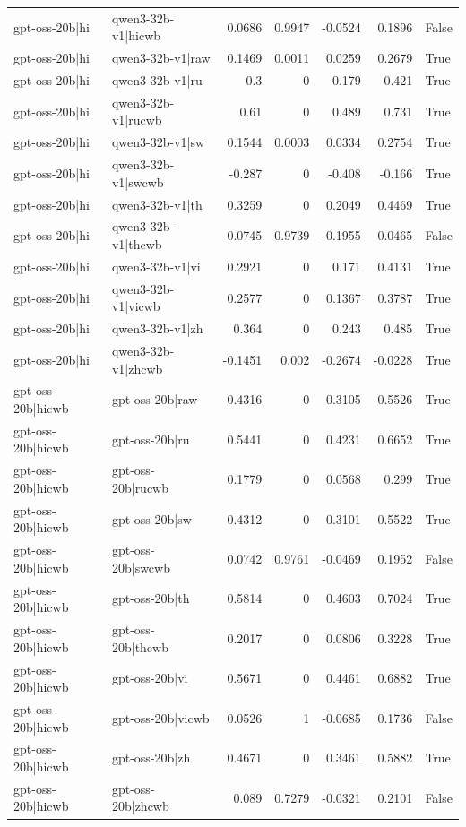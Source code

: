 \begin{table}
\begin{tabular}{l l r r r r l}
gpt-oss-20b|hi & qwen3-32b-v1|hicwb & 0.0686 & 0.9947 & -0.0524 & 0.1896 & False \\
gpt-oss-20b|hi & qwen3-32b-v1|raw & 0.1469 & 0.0011 & 0.0259 & 0.2679 & True \\
gpt-oss-20b|hi & qwen3-32b-v1|ru & 0.3 & 0 & 0.179 & 0.421 & True \\
gpt-oss-20b|hi & qwen3-32b-v1|rucwb & 0.61 & 0 & 0.489 & 0.731 & True \\
gpt-oss-20b|hi & qwen3-32b-v1|sw & 0.1544 & 0.0003 & 0.0334 & 0.2754 & True \\
gpt-oss-20b|hi & qwen3-32b-v1|swcwb & -0.287 & 0 & -0.408 & -0.166 & True \\
gpt-oss-20b|hi & qwen3-32b-v1|th & 0.3259 & 0 & 0.2049 & 0.4469 & True \\
gpt-oss-20b|hi & qwen3-32b-v1|thcwb & -0.0745 & 0.9739 & -0.1955 & 0.0465 & False \\
gpt-oss-20b|hi & qwen3-32b-v1|vi & 0.2921 & 0 & 0.171 & 0.4131 & True \\
gpt-oss-20b|hi & qwen3-32b-v1|vicwb & 0.2577 & 0 & 0.1367 & 0.3787 & True \\
gpt-oss-20b|hi & qwen3-32b-v1|zh & 0.364 & 0 & 0.243 & 0.485 & True \\
gpt-oss-20b|hi & qwen3-32b-v1|zhcwb & -0.1451 & 0.002 & -0.2674 & -0.0228 & True \\
gpt-oss-20b|hicwb & gpt-oss-20b|raw & 0.4316 & 0 & 0.3105 & 0.5526 & True \\
gpt-oss-20b|hicwb & gpt-oss-20b|ru & 0.5441 & 0 & 0.4231 & 0.6652 & True \\
gpt-oss-20b|hicwb & gpt-oss-20b|rucwb & 0.1779 & 0 & 0.0568 & 0.299 & True \\
gpt-oss-20b|hicwb & gpt-oss-20b|sw & 0.4312 & 0 & 0.3101 & 0.5522 & True \\
gpt-oss-20b|hicwb & gpt-oss-20b|swcwb & 0.0742 & 0.9761 & -0.0469 & 0.1952 & False \\
gpt-oss-20b|hicwb & gpt-oss-20b|th & 0.5814 & 0 & 0.4603 & 0.7024 & True \\
gpt-oss-20b|hicwb & gpt-oss-20b|thcwb & 0.2017 & 0 & 0.0806 & 0.3228 & True \\
gpt-oss-20b|hicwb & gpt-oss-20b|vi & 0.5671 & 0 & 0.4461 & 0.6882 & True \\
gpt-oss-20b|hicwb & gpt-oss-20b|vicwb & 0.0526 & 1 & -0.0685 & 0.1736 & False \\
gpt-oss-20b|hicwb & gpt-oss-20b|zh & 0.4671 & 0 & 0.3461 & 0.5882 & True \\
gpt-oss-20b|hicwb & gpt-oss-20b|zhcwb & 0.089 & 0.7279 & -0.0321 & 0.2101 & False \\

\end{tabular}
\end{table}
